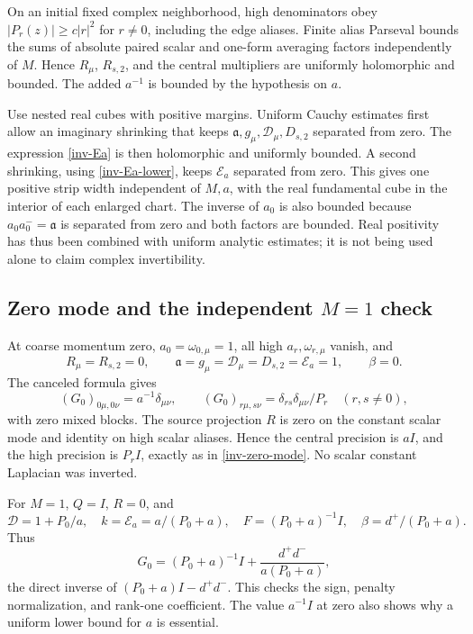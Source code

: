 \documentclass[11pt]{article}
\theoremstyle{remark}
\begin{document}
On an initial fixed complex neighborhood, high denominators obey
$|P_r(z)|\ge c|r|^2$ for $r\ne0$, including the edge aliases.
Finite alias Parseval bounds the sums of absolute paired scalar and
one-form averaging factors independently of $M$. Hence $R_\mu$,
$R_{s,2}$, and the central multipliers are uniformly holomorphic and
bounded. The added $a^{-1}$ is bounded by the hypothesis on $a$.

Use nested real cubes with positive margins. Uniform Cauchy estimates
first allow an imaginary shrinking that keeps $\mathfrak a,g_\mu,
\mathcal D_\mu,D_{s,2}$ separated from zero. The expression
\eqref{inv-Ea} is then holomorphic and uniformly bounded. A second
shrinking, using \eqref{inv-Ea-lower}, keeps $\mathcal E_a$ separated
from zero. This gives one positive strip width independent of $M,a$,
with the real fundamental cube in the interior of each enlarged chart.
The inverse of $a_0$ is also bounded because $a_0a_0^-=\mathfrak a$
is separated from zero and both factors are bounded. Real positivity
has thus been combined with uniform analytic estimates; it is not
being used alone to claim complex invertibility.

\subsection{Zero mode and the independent $M=1$ check}

At coarse momentum zero, $a_0=\omega_{0,\mu}=1$, all high
$a_r,\omega_{r,\mu}$ vanish, and
\[
 R_\mu=R_{s,2}=0,\qquad
 \mathfrak a=g_\mu=\mathcal D_\mu=D_{s,2}=\mathcal E_a=1,
 \qquad\beta=0.
\]
The canceled formula gives
\begin{equation}\label{inv-zero-mode}
 (G_0)_{0\mu,0\nu}=a^{-1}\delta_{\mu\nu},\qquad
 (G_0)_{r\mu,s\nu}=\delta_{rs}\delta_{\mu\nu}/P_r
       \quad(r,s\ne0),
\end{equation}
with zero mixed blocks. The source projection $R$ is zero on the
constant scalar mode and identity on high scalar aliases. Hence the
central precision is $aI$, and the high precision is $P_rI$, exactly
as in \eqref{inv-zero-mode}. No scalar constant Laplacian was inverted.

For $M=1$, $Q=I$, $R=0$, and
\[
 \mathcal D=1+P_0/a,\quad k=\mathcal E_a=a/(P_0+a),\quad
 F=(P_0+a)^{-1}I,\quad\beta=d^+/(P_0+a).
\]
Thus
\begin{equation}\label{inv-M1}
 G_0=(P_0+a)^{-1}I+\frac{d^+d^-}{a(P_0+a)},
\end{equation}
the direct inverse of $(P_0+a)I-d^+d^-$. This checks the sign,
penalty normalization, and rank-one coefficient. The value $a^{-1}I$
at zero also shows why a uniform lower bound for $a$ is essential.
\end{document}
